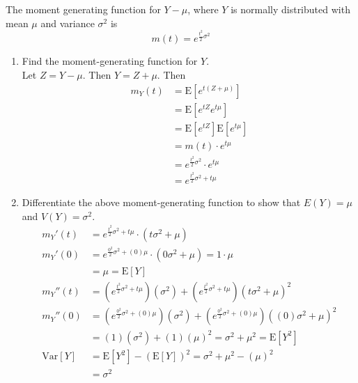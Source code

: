 \documentclass[12pt]{article}
\newcommand{\ques}[1]{\noindent {\bf Question #1: }}
\begin{document}
\ques{4.138} The moment generating function for $Y - \mu$, where $Y$ is normally distributed with mean $\mu$ and variance $\sigma^2$ is $$ m(t) = e^{\frac{t^2}{2}\sigma^2} $$ 
\begin{enumerate} 
\item Find the moment-generating function for $Y$. \\
Let $Z = Y - \mu$. Then $Y = Z + \mu$. Then 
$$ \begin{aligned} 
m_Y(t) &= \text{E}[e^{t(Z + \mu)}] \\ &= \text{E}[e^{tZ}e^{t\mu}] \\ &= \text{E}[e^{tZ}]\text{E}[e^{t\mu}] \\ &= m(t) \cdot e^{t\mu} \\ &= e^{\frac{t^2}{2}\sigma^2} \cdot e^{t\mu} \\ &= e^{\frac{t^2}{2}\sigma^2 + t\mu} \end{aligned} $$ 
\item Differentiate the above moment-generating function to show that $E(Y) = \mu$ and $V(Y) = \sigma^2$. 
$$ \begin{aligned} m_Y'(t) &= e^{\frac{t^2}{2}\sigma^2 + t\mu} \cdot (t\sigma^2 + \mu) \\ m_Y'(0) &= e^{\frac{0^2}{2}\sigma^2 + (0)\mu} \cdot (0\sigma^2 + \mu) = 1 \cdot \mu \\ &= \mu = \text{E}[Y] \\ 
m_Y''(t) &= (e^{\frac{t^2}{2}\sigma^2 + t\mu})(\sigma^2) + (e^{\frac{t^2}{2}\sigma^2 + t\mu})(t\sigma^2 + \mu)^2 \\ m_Y''(0) &= (e^{\frac{0^2}{2}\sigma^2 + (0)\mu})(\sigma^2) + (e^{\frac{0^2}{2}\sigma^2 + (0)\mu})((0)\sigma^2 + \mu)^2 \\ &= (1)(\sigma^2) + (1)(\mu)^2 = \sigma^2 + \mu^2 = \text{E}[Y^2] \\ \text{Var}[Y] &= \text{E}[Y^2] - (\text{E}[Y])^2 = \sigma^2 + \mu^2 - (\mu)^2 \\ &= \sigma^2 
 \end{aligned} $$ 

\end{enumerate} 
\end{document}
